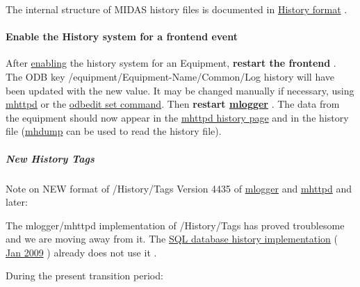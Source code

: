 The internal structure of MIDAS history files is documented in \hyperlink{F_History_logging_F_History_format}{History format} . \par


\label{F_History_logging_idx_history_enable}
\hypertarget{F_History_logging_idx_history_enable}{}
 \hypertarget{F_History_logging_F_Enable_History_Event}{}\paragraph{Enable the History system for a frontend event}\label{F_History_logging_F_Enable_History_Event}
After \hyperlink{F_History_logging_F_Frontend_History_Event}{enabling} the history system for an Equipment, {\bfseries  restart the frontend }. The ODB key /equipment/Equipment-\/Name/Common/Log history will have been updated with the new value. It may be changed manually if necessary, using \hyperlink{RC_mhttpd_ODB_page}{mhttpd} or the \hyperlink{RC_odbedit_examples_RC_odbedit_set}{odbedit set command}. Then {\bfseries  restart \hyperlink{F_Logging_F_mlogger_utility}{mlogger} } . The data from the equipment should now appear in the \hyperlink{RC_mhttpd_History_page}{mhttpd history page} and in the history file (\hyperlink{F_History_logging_F_mhdump_utility}{mhdump} can be used to read the history file).

\label{F_History_logging_idx_history_tags_new}
\hypertarget{F_History_logging_idx_history_tags_new}{}
 \hypertarget{F_History_logging_F_new_history_tags}{}\subparagraph{New History Tags}\label{F_History_logging_F_new_history_tags}
Note on NEW format of  /History/Tags Version 4435 of \hyperlink{F_Logging_F_mlogger_utility}{mlogger} and \hyperlink{RC_mhttpd_utility}{mhttpd} and later:  \par


The mlogger/mhttpd implementation of /History/Tags has proved troublesome and we are moving away from it. The \hyperlink{F_History_logging_F_History_sql_internal}{SQL database history implementation} ( \hyperlink{NDF_ndf_jan_2009}{Jan 2009} ) already does not use it . \par
During the present transition period:


